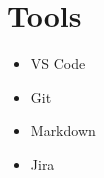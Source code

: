 \documentclass[../cv.tex]{subfiles}
\begin{document}
\begin{minipage}[t]{0.15\linewidth}
	\section{Tools}
	\begin{itemize}[leftmargin=*]
		\item VS Code
		\item Git		
		\item Markdown
		\item Jira
	\end{itemize}
\end{minipage}
\end{document}
